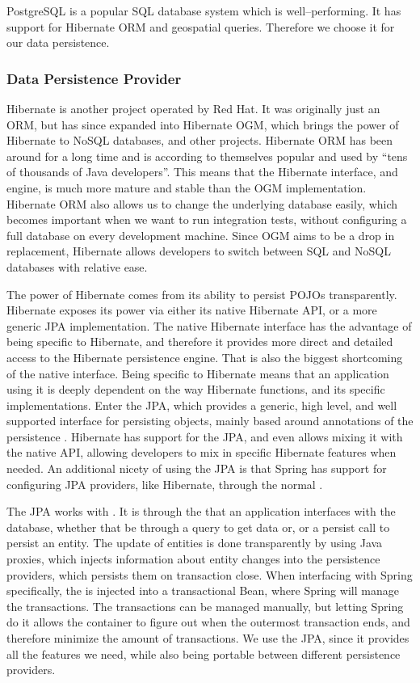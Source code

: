 PostgreSQL is a popular SQL database system which is well--performing.
It has support for Hibernate ORM and geospatial queries.
Therefore we choose it for our data persistence.

\subsubsection{Data Persistence Provider}
Hibernate is another project operated by Red Hat.
It was originally just an \ac{ORM}, but has since expanded into Hibernate \ac{OGM}, which brings the power of Hibernate to NoSQL databases, and other projects.
Hibernate \ac{ORM} has been around for a long time and is according to themselves popular and used by ``tens of thousands of Java developers''.\cite{hibernate_pop}
This means that the Hibernate interface, and engine, is much more mature and stable than the \ac{OGM} implementation.
Hibernate \ac{ORM} also allows us to change the underlying database easily, which becomes important when we want to run integration tests, without configuring a full database on every development machine.
Since \ac{OGM} aims to be a drop in replacement, Hibernate allows developers to switch between SQL and NoSQL databases with relative ease.

The power of Hibernate comes from its ability to persist \acp{POJO} transparently.
Hibernate exposes its power via either its native Hibernate API, or a more generic \ac{JPA} implementation.
The native Hibernate interface has the advantage of being specific to Hibernate, and therefore it provides more direct and detailed access to the Hibernate persistence engine.
That is also the biggest shortcoming of the native interface.
Being specific to Hibernate means that an application using it is deeply dependent on the way Hibernate functions, and its specific implementations.
Enter the \ac{JPA}, which provides a generic, high level, and well supported interface for persisting objects, mainly based around annotations of the persistence .
Hibernate has support for the \ac{JPA}, and even allows mixing it with the native API, allowing developers to mix in specific Hibernate features when needed.
An additional nicety of using the \ac{JPA} is that Spring has support for configuring \ac{JPA} providers, like Hibernate, through the normal .

The \ac{JPA} works with .
It is through the  that an application interfaces with the database, whether that be through a query to get data or, or a persist call to persist an entity.
The update of entities is done transparently by using Java proxies, which injects information about entity changes into the persistence providers, which persists them on transaction close.
When interfacing with Spring specifically, the  is injected into a transactional Bean, where Spring will manage the transactions.
The transactions can be managed manually, but letting Spring do it allows the container  to figure out when the outermost transaction ends, and therefore minimize the amount of transactions.
We use the \ac{JPA}, since it provides all the features we need, while also being portable between different persistence providers.

